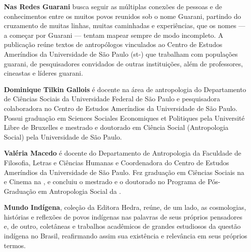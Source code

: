 \textbf{Nas Redes Guarani} busca seguir as múltiplas conexões de pessoas e de conhecimentos entre
os muitos povos reunidos sob o nome Guarani, partindo do cruzamento de muitas linhas, muitas
caminhadas e experiências, que os nomes — a começar por Guarani — tentam mapear sempre de modo
incompleto. A publicação reúne textos de antropólogos vinculados ao Centro de Estudos Ameríndios
da Universidade de São Paulo (st-) que trabalham com populações
guarani, de pesquisadores convidados de outras instituições, além de professores, cineastas e
líderes guarani.

\textbf{Dominique Tilkin Gallois} é docente na área de antropologia do Departamento de Ciências
Sociais da Universidade Federal de São Paulo e pesquisadora colaboradora no Centro de Estudos
Ameríndios da Universidade de São Paulo. Possui graduação em Sciences Sociales Economiques et
Politiques pela Université Libre de Bruxelles e mestrado e doutorado em Ciência Social
(Antropologia Social) pela Universidade de São Paulo.

\textbf{Valéria Macedo} é docente do Departamento de Antropologia da Faculdade de Filosofia,
Letras e Ciências Humanas e Coordenadora do Centro de Estudos Ameríndios da Universidade de São
Paulo. Fez graduação em Ciências Sociais na  e Cinema na , e concluiu o
mestrado e o doutorado no Programa de Pós-Graduação em Antropologia Social da .

\textbf{Mundo Indígena}, coleção da Editora Hedra, reúne, de um lado, as cosmologias, histórias
e reflexões de povos indígenas nas palavras de seus próprios pensadores e, de outro, coletâneas
e trabalhos acadêmicos de grandes estudiosos da questão indígena no Brasil, reafirmando assim sua
existência e relevância em seus próprios termos.\par